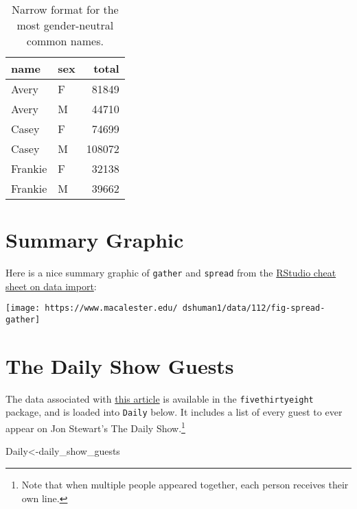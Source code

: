 \documentclass[]{tufte-handout}
\newenvironment{Shaded}{}{}
\newcommand{\NormalTok}[1]{{#1}}
\theoremstyle{definition}
\theoremstyle{definition}
\theoremstyle{definition}
\theoremstyle{remark}
\begin{document}
\begin{table}

\caption{\label{tab:unnamed-chunk-11}Narrow format for the most gender-neutral common names.}
\centering
\begin{tabular}[t]{l|l|r}
\hline
name & sex & total\\
\hline
Avery & F & 81849\\
\hline
Avery & M & 44710\\
\hline
Casey & F & 74699\\
\hline
Casey & M & 108072\\
\hline
Frankie & F & 32138\\
\hline
Frankie & M & 39662\\
\hline
\end{tabular}
\end{table}

\section{Summary Graphic}\label{summary-graphic}

Here is a nice summary graphic of \texttt{gather} and \texttt{spread}
from the
\href{https://github.com/rstudio/cheatsheets/raw/master/source/pdfs/data-import-cheatsheet.pdf}{RStudio
cheat sheet on data import}:

\texttt{[image: https://www.macalester.edu/~dshuman1/data/112/fig-spread-gather]}

\section{The Daily Show Guests}\label{the-daily-show-guests}

The data associated with
\href{https://fivethirtyeight.com/datalab/every-guest-jon-stewart-ever-had-on-the-daily-show/}{this
article} is available in the \texttt{fivethirtyeight} package, and is
loaded into \texttt{Daily} below. It includes a list of every guest to
ever appear on Jon Stewart's The Daily Show.\footnote{Note that when
  multiple people appeared together, each person receives their own
  line.}

\begin{Shaded}
\begin{Highlighting}[]
\NormalTok{Daily<-daily_show_guests}
\end{Highlighting}
\end{Shaded}
\end{document}
